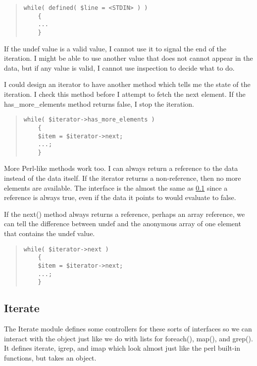 \begin{quote}
\begin{verbatim}
while( defined( $line = <STDIN> ) )
	{
	...
	}
\end{verbatim}
\end{quote}

If the undef value is a valid value, I cannot use it to signal
the end of the iteration.  I might be able to use another value 
that does not cannot appear in the data, but if any value is
valid, I cannot use inspection to decide what to do.

I could design an iterator to have another method which tells
me the state of the iteration.  I check this method before 
I attempt to fetch the next element.  If the has\_more\_elements
method returns false, I stop the iteration.

\begin{quote}
\begin{verbatim}
while( $iterator->has_more_elements )
	{
	$item = $iterator->next;
	...;
	}
\end{verbatim}
\end{quote}

More Perl-like methods work too.  I can always return a reference to the data instead of the data
itself. If the iterator returns a non-reference, then no more elements
are available.  The interface is the almost the same as \ref{} since a
reference is always true, even if the data it points to would evaluate
to false.

If the next() method always returns a reference, perhaps an array
reference, we can tell the difference between undef and the anonymous
array of one element that contains the undef value.

\begin{quote}
\begin{verbatim}
while( $iterator->next )
	{
	$item = $iterator->next;
	...;
	}
\end{verbatim}
\end{quote}

\subsection{Iterate}

The Iterate module defines some controllers for these sorts of 
interfaces so we can interact with the object just like we do
with lists for foreach(), map(), and grep().  It defines
iterate, igrep, and imap which look almost just like the
perl built-in functions, but takes an object.

